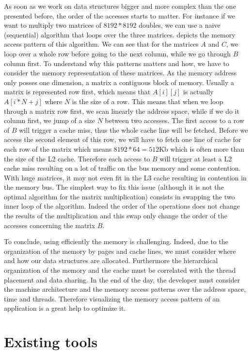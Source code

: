As soon as we work on data structures bigger and more complex than the one presented before, the order of the accesses starts to matter.
For instance if we want to multiply two matrices of $8192*8192$ doubles, we can use a naive (sequential) algorithm that loops over the three matrices.
 depicts the memory access pattern of this algorithm.
We can see that for the matrices $A$ and $C$, we loop over a whole row before going to the next column, while we go through $B$ column first.
To understand why this patterns matters and how, we have to consider the memory representation of these matrices.
As the memory address only posses one dimension, a matrix a contiguous block of memory.
Usually a matrix is represented row first, which means that $A[i][j]$ is actually $A[i*N+j]$ where $N$ is the size of a row.
This means that when we loop through a matrix row first, we scan linearly the address space, while if we do it column first, we jump of a size $N$ between two accesses.
The first access to a row of $B$ will trigger a cache miss, thus the whole cache line will be fetched.
Before we access the second element of this row, we will have to fetch one line of cache for each row of the matrix which means $8192*64=512$Kb which is often more than the size of the L2 cache.
Therefore each access to $B$ will trigger at least a L2 cache miss resulting on a lot of traffic on the bus memory and some contention.
With huge matrices, it may not even fit in the L3 cache resulting in contention in the memory bus.
The simplest way to fix this issue (although it is not the optimal algorithm for the matrix multiplication) consists in swapping the two inner loop of the algorithm.
Indeed the order of the operations does not change the results of the multiplication and this swap only change the order of the accesses concerning the matrix $B$.

To conclude, using efficiently the memory is challenging.
Indeed, due to the organization of the memory by pages and cache lines, we must consider where and how our data structures are allocated.
Furthermore the hierarchical organization of the memory and the cache must be correlated with the thread placement and data sharing.
In the end of the day, the developer must consider the machine architecture and the memory access patterns over the address space, time and threads.
Therefore visualizing the memory access pattern of an application is a great help to optimize it.

\section{Existing tools}
\label{sec:mem-tools}

